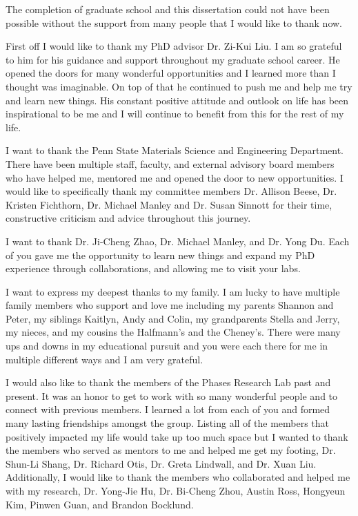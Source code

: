 The completion of graduate school and this dissertation could not have been possible without the support from many people that I would like to thank now.

First off I would like to thank my PhD advisor Dr. Zi-Kui Liu. I am so grateful to him for his guidance and support throughout my graduate school career. He opened the doors for many wonderful opportunities and I learned more than I thought was imaginable. On top of that he continued to push me and help me try and learn new things. His constant positive attitude and outlook on life has been inspirational to be me and I will continue to benefit from this for the rest of my life.

I want to thank the Penn State Materials Science and Engineering Department. There have been multiple staff, faculty, and external advisory board members who have helped me, mentored me and opened the door to new opportunities. I would like to specifically thank my committee members Dr. Allison Beese, Dr. Kristen Fichthorn, Dr. Michael Manley and Dr. Susan Sinnott for their time, constructive criticism and advice throughout this journey.

I want to thank Dr. Ji-Cheng Zhao, Dr. Michael Manley, and Dr. Yong Du. Each of you gave me the opportunity to learn new things and expand my PhD experience through collaborations, and allowing me to visit your labs. 

I want to express my deepest thanks to my family. I am lucky to have multiple family members who support and love me including my parents Shannon and Peter, my siblings Kaitlyn, Andy and Colin, my grandparents Stella and Jerry, my nieces, and my cousins the Halfmann's and the Cheney's. There were many ups and downs in my educational pursuit and you were each there for me in multiple different ways and I am very grateful.

I would also like to thank the members of the Phases Research Lab past and present. It was an honor to get to work with so many wonderful people and to connect with previous members. I learned a lot from each of you and formed many lasting friendships amongst the group. Listing all of the members that positively impacted my life would take up too much space but I wanted to thank the members who served as mentors to me and helped me get my footing, Dr. Shun-Li Shang, Dr. Richard Otis, Dr. Greta Lindwall, and Dr. Xuan Liu. Additionally, I would like to thank the members who collaborated and helped me with my research, Dr. Yong-Jie Hu, Dr. Bi-Cheng Zhou, Austin Ross, Hongyeun Kim, Pinwen Guan, and Brandon Bocklund. 

